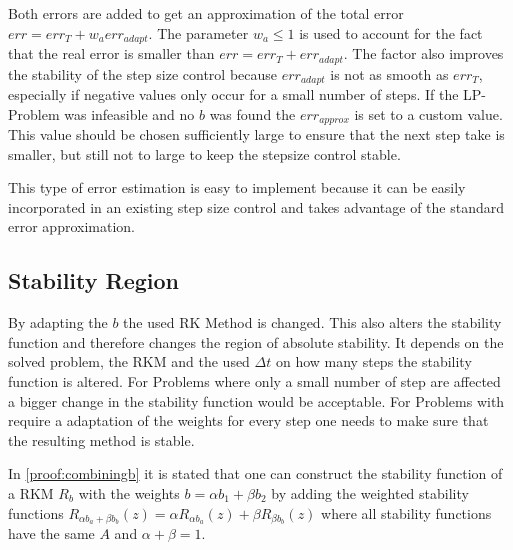 \documentclass{article}
\begin{document}
Both errors are added to get an approximation of the total error $err = err_T +w_a err_{adapt}$. The parameter $w_a \leq 1$ is used to account for the fact that the real error is smaller than $err = err_T +err_{adapt}$. The factor also improves the stability of the step size control because $err_{adapt}$ is not as smooth as $err_T$, especially if negative values only occur for a small number of steps.
If the LP-Problem was infeasible and no $b$ was found the $err_{approx}$ is set to a custom value. This value should be chosen sufficiently large to ensure that the next step take is smaller, but still not to large to keep the stepsize control stable.

This type of error estimation is easy to implement because it can be easily incorporated in an existing step size control and takes advantage of the standard error approximation.



\subsection{Stability Region}

By adapting the $b$ the used RK Method is changed. This also alters the stability function and therefore changes the region of absolute stability. 
It depends on the solved problem, the RKM and the used $\Delta t$ on how many steps the stability function is altered. For Problems where only a small number of step are affected a bigger change in the stability function would be acceptable. For Problems with require a adaptation of the weights for every step one needs to make sure that the resulting method is stable.


In \ref{proof:combiningb} it is stated that one can construct the stability function of a RKM  $R_b$  with the weights $b = \alpha b_1 + \beta b_2$ by adding the weighted stability functions $R_{\alpha b_a+\beta b_b}(z) = \alpha R_{\alpha b_a}(z) + \beta R_{\beta b_b}(z) $ where all stability functions have the same $A$ and $\alpha + \beta = 1$.

\end{document}
